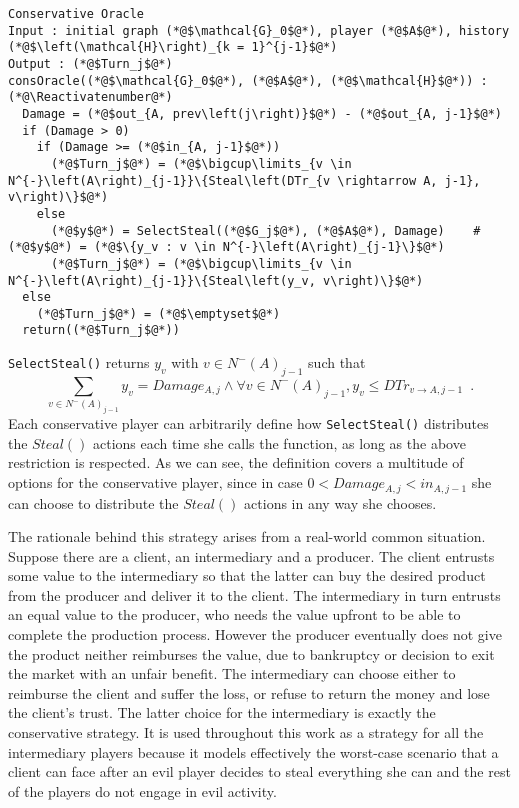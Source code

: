 \documentclass[11pt]{llncs}
\makeatletter
\newcommand*\Suppressnumber{%
  \lst@AddToHook{OnNewLine}{%
    \let\thelstnumber\relax%
     \advance\c@lstnumber-\@ne\relax%
    }%
}
\theoremstyle{definition}
\makeatother
\begin{document}
     \Suppressnumber
     \begin{lstlisting}[label=conservativeoracle, style=numbers]
Conservative Oracle
Input : initial graph (*@$\mathcal{G}_0$@*), player (*@$A$@*), history (*@$\left(\mathcal{H}\right)_{k = 1}^{j-1}$@*)
Output : (*@$Turn_j$@*)
consOracle((*@$\mathcal{G}_0$@*), (*@$A$@*), (*@$\mathcal{H}$@*)) : (*@\Reactivatenumber@*)
  Damage = (*@$out_{A, prev\left(j\right)}$@*) - (*@$out_{A, j-1}$@*)
  if (Damage > 0)
    if (Damage >= (*@$in_{A, j-1}$@*))
      (*@$Turn_j$@*) = (*@$\bigcup\limits_{v \in N^{-}\left(A\right)_{j-1}}\{Steal\left(DTr_{v \rightarrow A, j-1}, v\right)\}$@*)
    else
      (*@$y$@*) = SelectSteal((*@$G_j$@*), (*@$A$@*), Damage)    #(*@$y$@*) = (*@$\{y_v : v \in N^{-}\left(A\right)_{j-1}\}$@*)
      (*@$Turn_j$@*) = (*@$\bigcup\limits_{v \in N^{-}\left(A\right)_{j-1}}\{Steal\left(y_v, v\right)\}$@*)
  else
    (*@$Turn_j$@*) = (*@$\emptyset$@*)
  return((*@$Turn_j$@*))
     \end{lstlisting}
     \texttt{SelectSteal()} returns $y_v$ with $v \in N^{-}\left(A\right)_{j-1}$ such that
     \begin{equation}
        \sum\limits_{v \in N^{-}\left(A\right)_{j-1}}y_v = Damage_{A, j} \wedge \forall v \in N^{-}\left(A\right)_{j-1},
        y_v \leq DTr_{v \rightarrow A, j-1} \enspace.
     \end{equation}
     Each conservative player can arbitrarily define how \texttt{SelectSteal()} distributes the $Steal\left(\right)$ actions
     each time she calls the function, as long as the above restriction is respected. As we can see, the definition covers a
     multitude of options for the conservative player, since in case $0 < Damage_{A,j} < in_{A,j-1}$ she can choose to
     distribute the $Steal\left(\right)$ actions in any way she chooses.

     The rationale behind this strategy arises from a real-world common situation. Suppose there are a client, an
     intermediary and a producer. The client entrusts some value to the intermediary so that the latter can buy the desired
     product from the producer and deliver it to the client. The intermediary in turn entrusts an equal value to the
     producer, who needs the value upfront to be able to complete the production process. However the producer eventually
     does not give the product neither reimburses the value, due to bankruptcy or decision to exit the market with an unfair
     benefit. The intermediary can choose either to reimburse the client and suffer the loss, or refuse to return the money
     and lose the client's trust. The latter choice for the intermediary is exactly the conservative strategy. It is used
     throughout this work as a strategy for all the intermediary players because it models effectively the worst-case
     scenario that a client can face after an evil player decides to steal everything she can and the rest of the players do
     not engage in evil activity.
\end{document}
